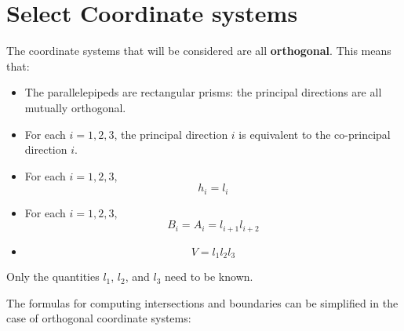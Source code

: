 \documentclass{book}
\begin{document}
\section{Select Coordinate systems}

The coordinate systems that will be considered are all {\bf orthogonal}. This means that:
\begin{itemize}
\item The parallelepipeds are rectangular prisms: the principal directions are all mutually orthogonal. 
\item For each \(i = 1, 2, 3\), the principal direction \(i\) is equivalent to the co-principal direction \(i\). 
\item For each \(i = 1, 2, 3\), 
\[h_i = l_i\]
\item For each \(i = 1, 2, 3\),
\[B_i = A_i = l_{i+1} l_{i+2}\]
\item 
\[V = l_1 l_2 l_3\]
\end{itemize}
Only the quantities \(l_1\), \(l_2\), and \(l_3\) need to be known.

The formulas for computing intersections and boundaries can be simplified in the case of orthogonal coordinate systems:
\end{document}
